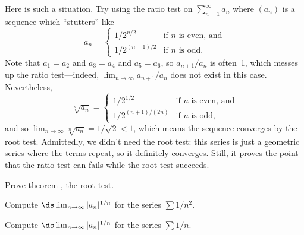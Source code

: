 Here is such a situation.  Try using the ratio test on
$\sum_{n=1}^\infty a_n$ where $(a_n)$ is a sequence which ``stutters''
like
$$
a_n = \begin{cases}
1/2^{n/2} & \mbox{if $n$ is even, and} \\
1/2^{(n+1)/2} & \mbox{if $n$ is odd.} 
\end{cases}
$$
Note that $a_1 = a_2$ and $a_3 = a_4$ and $a_5 = a_6$, so
$a_{n+1}/a_n$ is often~1, which messes up the ratio test---indeed,
$\lim_{n \to \infty} a_{n+1}/a_n$ does not exist in this case.
Nevertheless,
$$
\sqrt[n]{a_n} = \begin{cases}
1/2^{1/2} & \mbox{if $n$ is even, and} \\
1/2^{(n+1)/(2n)} & \mbox{if $n$ is odd,} 
\end{cases}
$$
and so $\lim_{n \to\infty} \sqrt[n]{a_n} = 1/\sqrt{2} < 1$, which
means the sequence converges by the root test.  Admittedly, we didn't
need the root test: this series is just a geometric series where the
terms repeat, so it definitely converges.  Still, it proves the point
that the ratio test can fails while the root test succeeds.

\begin{exercises}
\begin{exercise}
Prove theorem , the root test.\end{exercise}

\begin{exercise} Compute $\ds\lim_{n\to\infty} |a_n|^{1/n}$ for the series
$\sum 1/n^2$.
\end{exercise}

\begin{exercise} Compute $\ds\lim_{n\to\infty} |a_n|^{1/n}$ for the series
$\sum 1/n$.
\end{exercise}

\end{exercises}
